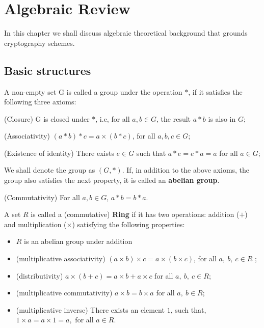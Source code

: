 \chapter{Algebraic Review}
\label{ch:algebra}

In this chapter we shall discuss algebraic theoretical background that grounds cryptography schemes.


\section{Basic structures}

\begin{definition}[Group]

A non-empty set G is called a group under the operation $*$, if it satisfies the following three axioms:

\begin{alineas}
    \item  (Closure) G is closed under $*$, i.e, for all $a,b\in G$, the result $a*b$ is also in $G$;
    \item (Associativity) $(a* b)* c = a\times (b*c)$, for all $a,b,c\in G$;
    \item (Existence of identity) There exists $e\in G$ such that $a*e=e*a=a$ for all $a\in G$;
    
    We shall denote the group as $(G,*)$. If, in addition to the above axioms, the group also satisfies the next property, it is called an \textbf{abelian group}.
    
    \item (Commutativity) For all $a,b\in G$, $a*b=b*a$.
\end{alineas}
\end{definition}

A set $R$ is called a (commutative) \textbf{Ring} if it has two operations: addition ($+$) and multiplication ($\times$) satisfying the following properties:

\begin{itemize}
    \item $R$ is an abelian group under addition
    \item (multiplicative associativity) $(a\times b)\times c = a\times (b\times c)$, for all $a,~b,~c\in R$ ;
    \item (distributivity) $a\times (b+c)=a\times b + a\times c$ for all $a,~b,~c\in R$;
    \item (multiplicative commutativity) $a\times b=b\times a$ for all $a,~b\in R$;
    \item (multiplicative inverse) There exists an element $1$, such that, $1\times a = a\times 1 = a,$ for all $a\in R$.
\end{itemize}

